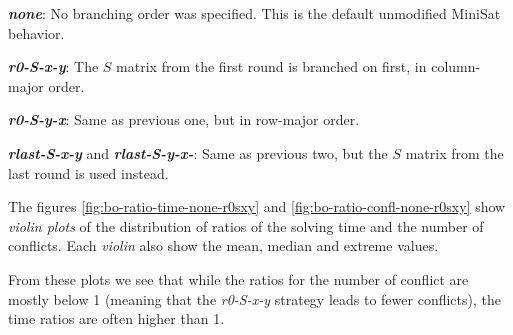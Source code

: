 \textbf{\emph{none}}: No branching order was specified. This is the default unmodified MiniSat behavior.

\textbf{\emph{r0-S-x-y}}: The $S$ matrix from the first round is branched on first, in column-major order.

\textbf{\emph{r0-S-y-x}}: Same as previous one, but in row-major order.

\textbf{\emph{rlast-S-x-y}} and \textbf{\emph{rlast-S-y-x-}}: Same as previous two, but the $S$ matrix from the last round is used instead.	

The figures \ref{fig:bo-ratio-time-none-r0sxy} and \ref{fig:bo-ratio-confl-none-r0sxy} show \emph{violin plots} of the distribution of ratios of the solving time and the number of conflicts.
Each \emph{violin} also show the mean, median and extreme values.

From these plots we see that while the ratios for the number of conflict are mostly below 1 (meaning that the \emph{r0-S-x-y} strategy leads to fewer conflicts), the time ratios are often higher than 1.

